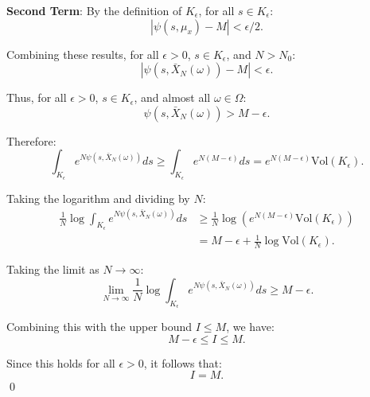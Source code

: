 \documentclass{article}
\theoremstyle{plain}
\theoremstyle{definition}
\theoremstyle{remark}
\begin{document}
\textbf{Second Term}: By the definition of $K_\epsilon$, for all $s \in K_\epsilon$:
\begin{equation}
|\psi(s, \mu_x) - M| < \epsilon/2.
\end{equation}

Combining these results, for all $\epsilon > 0$, $s \in K_\epsilon$, and $N > N_0$:
\begin{equation}
|\psi(s, \bar{X}_N(\omega)) - M| < \epsilon.
\end{equation}

Thus, for all $\epsilon > 0$, $s \in K_\epsilon$, and almost all $\omega \in \Omega$:
\begin{equation}
\psi(s, \bar{X}_N(\omega)) > M - \epsilon.
\end{equation}

Therefore:
\begin{equation}
\int_{K_\epsilon} e^{N \psi(s, \bar{X}_N(\omega))} ds \geq \int_{K_\epsilon} e^{N (M - \epsilon)} ds = e^{N (M - \epsilon)} \text{Vol}(K_\epsilon).
\end{equation}

Taking the logarithm and dividing by $N$:
\begin{align}
\frac{1}{N} \log \int_{K_\epsilon} e^{N \psi(s, \bar{X}_N(\omega))} ds 
&\geq \frac{1}{N} \log \left(e^{N (M - \epsilon)} \text{Vol}(K_\epsilon)\right) \\
&= M - \epsilon + \frac{1}{N} \log \text{Vol}(K_\epsilon).
\end{align}

Taking the limit as $N \to \infty$:
\begin{equation}
\lim_{N \to \infty} \frac{1}{N} \log \int_{K_\epsilon} e^{N \psi(s, \bar{X}_N(\omega))} ds \geq M - \epsilon.
\end{equation}

Combining this with the upper bound $I \leq M$, we have:
\begin{equation}
M - \epsilon \leq I \leq M.
\end{equation}

Since this holds for all $\epsilon > 0$, it follows that:
\begin{equation}
I = M.
\end{equation}
\qed
\end{document}
